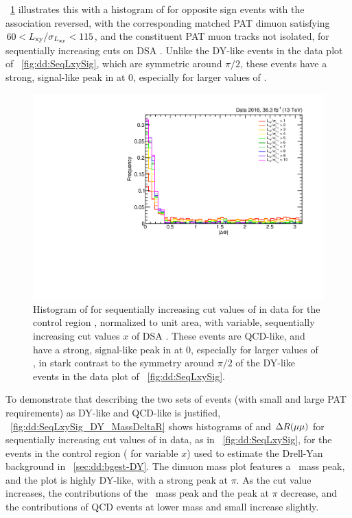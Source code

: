 \Fig~\ref{fig:dd:SeqLxySig_QCD_DeltaPhi} illustrates this with a histogram of \DeltaPhi for opposite sign events with the \DSAToPAT association reversed, with the corresponding matched PAT dimuon satisfying $60 < L_{\mathrm{xy}}/\sigma_{L_{\mathrm{xy}}} < 115$, and the constituent PAT muon tracks not isolated, for sequentially increasing cuts on DSA \LxySig.
Unlike the DY-like events in the data plot of \Fig~\ref{fig:dd:SeqLxySig}, which are symmetric around $\pi/2$, these events have a strong, signal-like peak in \DeltaPhi at 0, especially for larger values of \LxySig.

\begin{figure}[htpb]
  \centering
  \includegraphics[width=\DFigWidth]{figures/displaced/BGEST_EffectOfLxySigCut_DeltaPhi_Data_QCD-Like.pdf}
  \caption[Histogram of \DeltaPhi for sequentially increasing cut values of \LxySig for QCD-like events in data.]{Histogram of \DeltaPhi for sequentially increasing cut values of \LxySig in data for the control region , normalized to unit area, with variable, sequentially increasing cut values $x$ of DSA \LxySig. These events are QCD-like, and have a strong, signal-like peak in \DeltaPhi at 0, especially for larger values of \LxySig, in stark contrast to the symmetry around $\pi/2$ of the DY-like events in the data plot of \Fig~\ref{fig:dd:SeqLxySig}.}
  \label{fig:dd:SeqLxySig_QCD_DeltaPhi}
\end{figure}

\pagebreak
To demonstrate that describing the two sets of events (with small and large PAT \LxySig requirements) as DY-like and QCD-like is justified, \Fig~\ref{fig:dd:SeqLxySig_DY_MassDeltaR} shows histograms of \mMuMu and $\Delta R(\mathrm{\mu}\mathrm{\mu})$ for sequentially increasing cut values of \LxySig in data, as in \Fig~\ref{fig:dd:SeqLxySig}, for the events in the control region (\ie {} for variable $x$) used to estimate the Drell-Yan background in \Sec~\ref{sec:dd:bgest-DY}.
The dimuon mass plot features a \PZ\ mass peak, and the \deltaR plot is highly DY-like, with a strong peak at $\pi$.
As the cut value increases, the contributions of the \PZ\ mass peak and the \deltaR peak at $\pi$ decrease, and the contributions of QCD events at lower mass and small \deltaR increase slightly.

